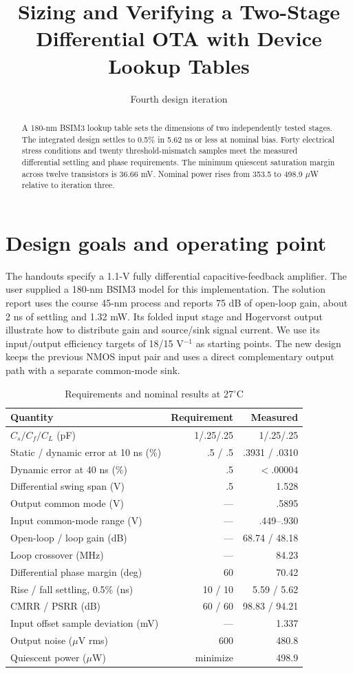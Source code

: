 \documentclass[journal,10pt]{IEEEtran}
\title{Sizing and Verifying a Two-Stage Differential OTA with Device Lookup Tables}
\author{Fourth design iteration}
\begin{document}
\maketitle
\begin{abstract}
A 180-nm BSIM3 lookup table sets the dimensions of two independently tested stages. The integrated design settles to 0.5\% in 5.62 ns or less at nominal bias. Forty electrical stress conditions and twenty threshold-mismatch samples meet the measured differential settling and phase requirements. The minimum quiescent saturation margin across twelve transistors is 36.66 mV. Nominal power rises from 353.5 to 498.9 $\mu$W relative to iteration three.
\end{abstract}
\section{Design goals and operating point}
The handouts specify a 1.1-V fully differential capacitive-feedback amplifier. The user supplied a 180-nm BSIM3 model for this implementation. The solution report uses the course 45-nm process and reports 75 dB of open-loop gain, about 2 ns of settling and 1.32 mW. Its folded input stage and Hogervorst output illustrate how to distribute gain and source/sink signal current. We use its input/output efficiency targets of 18/15 V$^{-1}$ as starting points. The new design keeps the previous NMOS input pair and uses a direct complementary output path with a separate common-mode sink.
\begin{table}[h]\centering
\caption{Requirements and nominal results at 27$^\circ$C}
\begin{tabular}{lrr}\toprule
Quantity & Requirement & Measured\\\midrule
$C_s/C_f/C_L$ (pF) & 1/.25/.25 & 1/.25/.25\\
Static / dynamic error at 10 ns (\%) & .5 / .5 & .3931 / .0310\\
Dynamic error at 40 ns (\%) & .5 & $<.00004$\\
Differential swing span (V) & .5 & 1.528\\
Output common mode (V) & --- & .5895\\
Input common-mode range (V) & --- & .449--.930\\
Open-loop / loop gain (dB) & --- & 68.74 / 48.18\\
Loop crossover (MHz) & --- & 84.23\\
Differential phase margin (deg) & 60 & 70.42\\
Rise / fall settling, 0.5\% (ns) & 10 / 10 & 5.59 / 5.62\\
CMRR / PSRR (dB) & 60 / 60 & 98.83 / 94.21\\
Input offset sample deviation (mV) & --- & 1.337\\
Output noise ($\mu$V rms) & 600 & 480.8\\
Quiescent power ($\mu$W) & minimize & 498.9\\\bottomrule
\end{tabular}
\end{table}
\end{document}
